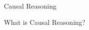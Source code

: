 \begin{frame}{Causal Reasoning}

    \begin{block}{What is Causal Reasoning?}

    \end{block}

    \begin{columns}
        
        
    \end{columns}

\end{frame}